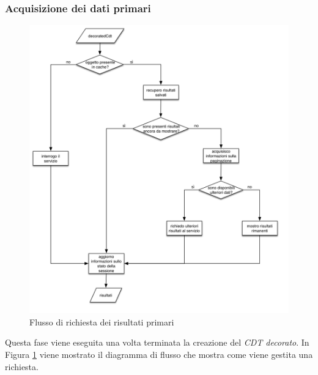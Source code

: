 \subsubsection*{Acquisizione dei dati primari}

\begin{figure}[!t]
	\centering
	\includegraphics[width=\textwidth]{4-progettazione-alto-livello/Immagini/diagramma_flusso_servizi_primari.png}
	\caption{Flusso di richiesta dei risultati primari\label{fig:flusso-servizi-primari}}
\end{figure}

Questa fase viene eseguita una volta terminata la creazione del \emph{CDT decorato}. In Figura \ref{fig:flusso-servizi-primari} viene mostrato il diagramma di flusso che mostra come viene gestita una richiesta.

